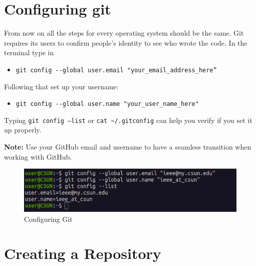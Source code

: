 \documentclass[12pt, a4paper]{article}
\begin{document}
\section{Configuring git}

From now on all the steps for every operating system should be the same.
Git requires its users to confirm people's identity to see who wrote the code. In the terminal type in
\begin{itemize}
\item\verb+git config --global user.email "your_email_address_here”+
\end{itemize}
Following that set up your username:
\begin{itemize}
\item \verb+git config --global user.name "your_user_name_here"+
\end{itemize}

Typing \texttt{git config --list} or \verb`cat ~/.gitconfig` can help you verify if you set it up properly.\\\par
\textbf{Note:} Use your GitHub email and username to have a seamless transition when working with GitHub.

\begin{figure}[H]
\centering
\includegraphics[scale=0.5]{../images/workshop-I/git-config.png}
\caption{Configuring Git}
\end{figure}
\section{Creating a Repository}
\end{document}

